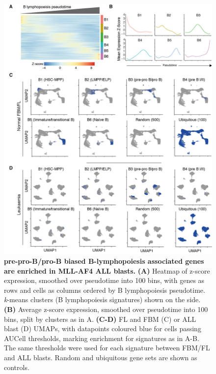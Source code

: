 \begin{figure}[p]
    \centering
    \includegraphics[width=\textwidth,height=\textheight,keepaspectratio]{figures/chapter4/ch4_multiome-tradeseq.png}
    \caption[{pre-pro-B/pro-B biased B-lymphopoiesis associated genes are enriched in MLL-AF4 ALL blasts.}]
    {\textbf{pre-pro-B/pro-B biased B-lymphopoiesis associated genes are enriched in MLL-AF4 ALL blasts.} 
    \textbf{(A)} Heatmap of z-score expression, smoothed over pseudotime into 100 bins, with genes as rows and cells as columns ordered by B lymphopoiesis pseudotime. \textit{k}-means clusters (B lymphopoiesis signatures) shown on the side.
    \textbf{(B)} Average z-score expression, smoothed over pseudotime into 100 bins, split by clusters as in A.
    \textbf{(C-D)} FL and FBM (C) or ALL blast (D) UMAPs, with datapoints coloured blue for cells passing AUCell thresholds, marking enrichment for signatures as in A-B. The same thresholds were used for each signature between FBM/FL and ALL blasts. Random and ubiquitous gene sets are shown as controls.
    }
    \label{fig:ch4_multiome-tradeseq}
\end{figure}


